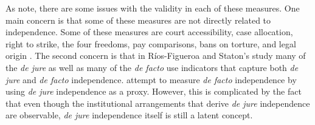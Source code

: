 \documentclass[JohnsonMADraft2.tex]{subfiles}
\begin{document}
As \citet{Rios2014} note, there are some issues with the validity in each of these measures.  One main concern is that some of these measures are not directly related to independence.  Some of these measures are court accessibility, case allocation, right to strike, the four freedoms, pay comparisons, bans on torture, and legal origin \citep{Feld2003,Keith2002a,Laporta2004,Rios2014}.  The second concern is that in R\'{i}os-Figueroa and Staton's study many of the \textit{de jure} as well as many of the \textit{de facto} use indicators that capture both \textit{de jure} and \textit{de facto} independence.  \citealt{Laporta2004} attempt to measure \textit{de facto} independence by using \textit{de jure} independence as a proxy.  However, this is complicated by the fact that even though the institutional arrangements that derive \textit{de jure} independence are observable, \textit{de jure} independence itself is still a latent concept. 
\end{document}

